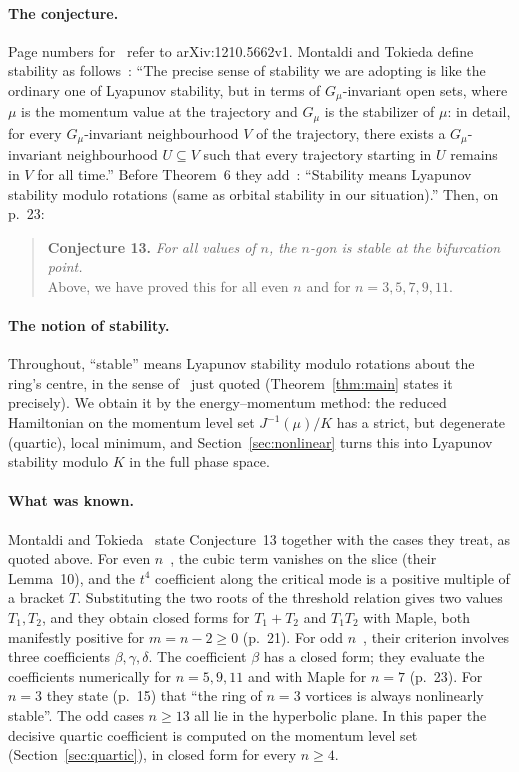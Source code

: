 \documentclass[11pt]{article}
\theoremstyle{definition}
\theoremstyle{remark}
\begin{document}
\paragraph{The conjecture.} Page numbers for~\cite{MT} refer to arXiv:1210.5662v1. Montaldi and Tokieda
define stability as follows~\cite[p.~10]{MT}:
``The precise sense of stability we are adopting is like the ordinary one of Lyapunov stability, but in
terms of $G_\mu$-invariant open sets, where $\mu$ is the momentum value at the trajectory and $G_\mu$ is
the stabilizer of $\mu$: in detail, for every $G_\mu$-invariant neighbourhood $V$ of the trajectory, there
exists a $G_\mu$-invariant neighbourhood $U\subseteq V$ such that every trajectory starting in $U$ remains
in $V$ for all time.'' Before Theorem~6 they add~\cite[p.~15]{MT}: ``Stability means Lyapunov stability
modulo rotations (same as orbital stability in our situation).'' Then, on p.~23:

\begin{quote}
\textbf{Conjecture 13.} \emph{For all values of $n$, the $n$-gon is stable at the bifurcation point.}\\
Above, we have proved this for all even $n$ and for $n = 3, 5, 7, 9, 11$.
\end{quote}

\paragraph{The notion of stability.} Throughout, ``stable'' means Lyapunov stability modulo rotations
about the ring's centre, in the sense of~\cite[p.~10, p.~15]{MT} just quoted (Theorem~\ref{thm:main} states it
precisely). We obtain it by the energy--momentum method: the reduced Hamiltonian on the momentum level set
$J^{-1}(\mu)/K$ has a strict, but degenerate (quartic), local minimum, and Section~\ref{sec:nonlinear} turns
this into Lyapunov stability modulo $K$ in the full phase space.

\paragraph{What was known.} Montaldi and Tokieda~\cite{MT} state Conjecture~13 together with the cases
they treat, as quoted above. For even $n$~\cite[\S3.5.1, pp.~20--21]{MT}, the cubic term vanishes on the
slice (their Lemma~10), and the $t^4$ coefficient along the critical mode is a positive multiple of a
bracket $T$. Substituting the two roots of the threshold relation gives two values $T_1,T_2$, and they
obtain closed forms for $T_1+T_2$ and $T_1T_2$ with Maple, both manifestly positive for $m=n-2\ge0$
(p.~21). For odd $n$~\cite[\S3.5.2, pp.~22--23]{MT}, their criterion involves three coefficients
$\beta,\gamma,\delta$. The coefficient $\beta$ has a closed form; they evaluate the coefficients numerically
for $n=5,9,11$ and with Maple for $n=7$ (p.~23). For $n=3$ they state (p.~15) that ``the ring of $n=3$
vortices is always nonlinearly stable''. The odd cases $n\ge13$ all lie in the hyperbolic plane. In this
paper the decisive quartic coefficient is computed on the momentum level set (Section~\ref{sec:quartic}),
in closed form for every $n\ge4$.
\end{document}
